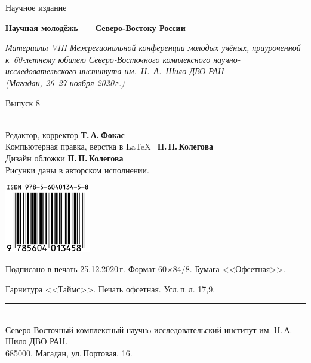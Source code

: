 \thispagestyle{empty}
\hspace{2cm}
\vfill
\begin{center}
  {Научное издание}

  \medskip
  \bigskip
  \textbf{\large Научная молодёжь~--- Северо-Востоку России}

  \medskip
  \textit{Материалы VIII Межрегиональной конференции молодых учёных, приуроченной к~60-летнему юбилею
  Северо-Восточного комплексного научно-исследовательского института им.~Н.~А.~Шило ДВО РАН\\ (Магадан,
  26--27 ноября 2020\,г.)}

  \vfill
  Выпуск 8
\end{center}
\vfill

\hspace{2cm}\\ \small
Редактор, корректор \textbf{Т.\,А.\,Фокас}\\
Компьютерная правка, верстка в \LaTeX~ \textbf{П.\,П.\,Колегова}\\
Дизайн обложки \textbf{П.\,П.\,Колегова}\\
Рисунки даны в авторском исполнении.

\vfill

\begin{center}
\includegraphics[height=30mm]{ISBN-978-5-6040134-5-8.jpg}
\end{center}


\enlargethispage{5\baselineskip}
\begin{changemargin}{-2cm}{-2cm}
\begin{center}
  \footnotesize
  Подписано в печать 25.12.2020\,г.  Формат 60$\times$84/8. Бумага
  <<Офсетная>>.\hspace*{2em}

  Гарнитура <<Таймс>>. Печать офсетная.  Усл.\,п.\,л. 17,9.
  \rule{1.1\textwidth}{.1mm}\\
  Северо-Восточный комплексный научнo-исследовательский институт им.
  Н.\,А.\,Шило ДВО РАН. \\ 685000, Магадан, ул.\,Портовая, 16.
\end{center}
\end{changemargin}
